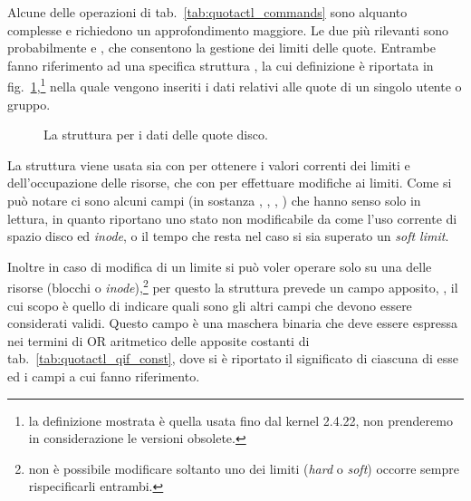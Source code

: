 Alcune delle operazioni di tab.~\ref{tab:quotactl_commands} sono alquanto
complesse e richiedono un approfondimento maggiore. Le due più rilevanti sono
probabilmente  e , che consentono la
gestione dei limiti delle quote. Entrambe fanno riferimento ad una specifica
struttura , la cui definizione è riportata in
fig.~\ref{fig:dqblk_struct},\footnote{la definizione mostrata è quella usata
  fino dal kernel 2.4.22, non prenderemo in considerazione le versioni
  obsolete.} nella quale vengono inseriti i dati relativi alle quote di un
singolo utente o gruppo.

\begin{figure}[!htb]
  \footnotesize \centering
  \begin{minipage}[c]{0.95\textwidth}
  \end{minipage} 
  \normalsize 
  \caption{La struttura  per i dati delle quote disco.}
  \label{fig:dqblk_struct}
\end{figure}

La struttura  viene usata sia con  per
ottenere i valori correnti dei limiti e dell'occupazione delle risorse, che
con  per effettuare modifiche ai limiti. Come si può notare
ci sono alcuni campi (in sostanza , ,
, ) che hanno senso solo in lettura, in quanto
riportano uno stato non modificabile da  come l'uso corrente di
spazio disco ed \textit{inode}, o il tempo che resta nel caso si sia superato
un \textit{soft limit}.

Inoltre in caso di modifica di un limite si può voler operare solo su una
delle risorse (blocchi o \textit{inode}),\footnote{non è possibile modificare
  soltanto uno dei limiti (\textit{hard} o \textit{soft}) occorre sempre
  rispecificarli entrambi.} per questo la struttura prevede un campo apposito,
, il cui scopo è quello di indicare quali sono gli altri campi
che devono essere considerati validi. Questo campo è una maschera binaria che
deve essere espressa nei termini di OR aritmetico delle apposite costanti di
tab.~\ref{tab:quotactl_qif_const}, dove si è riportato il significato di
ciascuna di esse ed i campi a cui fanno riferimento.

